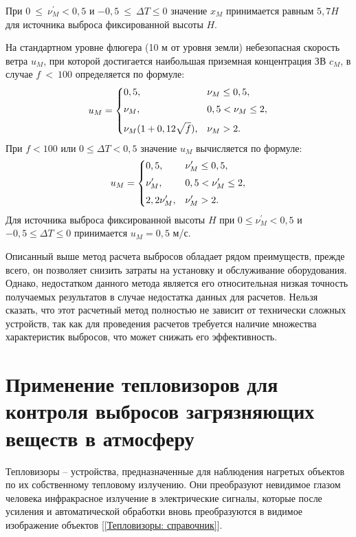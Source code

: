 \documentclass[14pt, a4paper]{extreport}
\begin{document}
	 При $0~\leq~\nu_M^\prime < 0,5$ и $-0,5~\leq~\Delta T \leq 0$ значение $x_M$ принимается равным $5,7H$ для источника выброса фиксированной высоты $H$.
	
	На стандартном уровне флюгера (10 м от уровня земли) небезопасная скорость ветра $u_M$, при которой достигается наибольшая приземная концентрация ЗВ $c_M$, в случае $f~<~100$ определяется по формуле:
	\begin{equation*}
		u_M = 
		\begin{dcases}
			0,5, & \nu_M \leq 0,5,  \vspace*{0.1cm} \\
			\nu_M, & 0,5 < \nu_M \leq 2, \vspace*{0.1cm} \\
			\nu_M(1 + 0,12\sqrt{f}), &  \nu_M > 2.
		\end{dcases}
		\label{eq:uM3}
	\end{equation*}
	При $f<100$ или $0 \leq \Delta T < 0,5$ значение $u_M$ вычисляется по формуле:
	\begin{equation*}
		u_M = 
		\begin{dcases}
			0,5, &  \nu_M^\prime \leq 0,5, \vspace*{0.1cm} \\
			\nu_M^\prime, & 0,5 < \nu_M^\prime \leq 2, \vspace*{0.1cm} \\
			2,2 \nu_M^\prime, & \nu_M^\prime > 2.
		\end{dcases}
		\label{eq:uM6}
	\end{equation*}
	Для источника выброса фиксированной высоты $H$ при $0 \leq \nu_M^\prime < 0,5$ и $-0,5 \leq \Delta T \leq 0$ принимается $u_M = 0,5$ м/с.
	
	Описанный выше метод расчета выбросов обладает рядом преимуществ, прежде всего, он позволяет снизить затраты на установку и обслуживание оборудования. Однако, недостатком данного метода является его относительная низкая точность получаемых результатов в случае недостатка данных для расчетов. Нельзя сказать, что этот расчетный метод полностью не зависит от технически сложных устройств, так как для проведения расчетов требуется наличие множества характеристик выбросов, что может снижать его эффективность.
	
\section [\vspace*{-0.22cm}Применение тепловизоров для контроля выбросов загрязняющих \hspace*{-0.9cm} веществ в атмосферу]{\vspace*{-0.22cm}Применение тепловизоров для контроля выбросов загрязняющих \\ \hspace*{-2.25cm} веществ в атмосферу}
	Тепловизоры -- устройства, предназначенные для наблюдения нагретых объектов по их собственному тепловому излучению. Они преобразуют невидимое глазом человека инфракрасное излучение в электрические сигналы, которые после усиления и автоматической обработки вновь преобразуются в видимое изображение объектов [\ref{Тепловизоры: справочник}].
	
\end{document}
